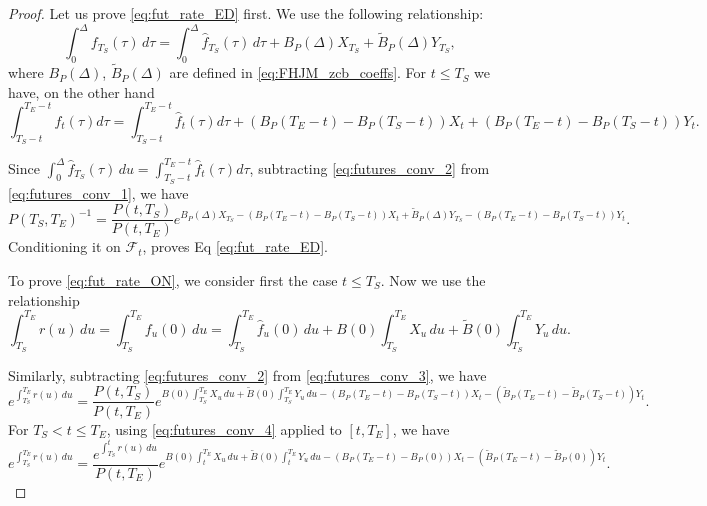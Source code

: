 \documentclass[pdftex,11pt,a4paper] {article}
\begin{document}
\begin{proof}
Let us prove \eqref{eq:fut_rate_ED} first. We use the following relationship:
\begin{equation}\label{eq:futures_conv_1}
\int_0^{\Delta}f_{T_S}(\tau)\,d\tau=\int_0^{\Delta}\hat f_{T_S}(\tau)\,d\tau+B_P(\Delta) X_{T_S}+\tilde B_P(\Delta) Y_{T_S},
\end{equation}
where $B_P(\Delta)$, $\tilde B_P(\Delta)$ are defined in \eqref{eq:FHJM_zcb_coeffs}. 
For $t\le T_S$ we have, on the other hand
\begin{equation}\label{eq:futures_conv_2}
\int_{T_S-t}^{T_E-t}f_{t}(\tau)d\tau=\int_{T_S-t}^{T_E-t}\hat f_{t}(\tau)d\tau+\left(B_P(T_E-t)-B_P(T_S-t)\right) X_{t}+\left(B_P(T_E-t)-B_P(T_S-t)\right) Y_{t}.
\end{equation}

Since $\int_{0}^{\Delta}\hat{f}_{T_S}(\tau)\,du=\int_{T_S-t}^{T_E-t}\hat f_{t}(\tau)d\tau$, 
subtracting \eqref{eq:futures_conv_2} from \eqref{eq:futures_conv_1}, we have 
\begin{equation*}
P(T_S,T_E)^{-1}=\frac{P(t,T_S)}{P(t,T_E)}e^{B_P(\Delta) X_{T_S}-\left(B_P(T_E-t)-B_P(T_S-t)\right) X_{t}+
\tilde B_P(\Delta) Y_{T_S}-\left(B_P(T_E-t)-B_P(T_S-t)\right) Y_{t}}.
\end{equation*}
Conditioning it on $\mathcal{F}_t$, proves Eq \eqref{eq:fut_rate_ED}. 

To prove \eqref{eq:fut_rate_ON}, we consider first the case $t\le T_S$. Now we use the relationship
\begin{equation}\label{eq:futures_conv_3}
\int_{T_S}^{T_E}r(u)\,du=\int_{T_S}^{T_E}f_u(0)\,du=\int_{T_S}^{T_E}\hat{f}_u(0)\,du+B(0)\int_{T_S}^{T_E}X_u\,du+\tilde B(0)\int_{T_S}^{T_E}Y_u\,du.
\end{equation}


Similarly, subtracting \eqref{eq:futures_conv_2} from \eqref{eq:futures_conv_3}, we have
\begin{equation}\label{eq:futures_conv_4}
e^{\int_{T_S}^{T_E}r(u)\,du}=\frac{P(t,T_S)}{P(t,T_E)}e^{B(0)\int_{T_S}^{T_E}X_u\,du+\tilde B(0)\int_{T_S}^{T_E}Y_u\,du-\left(B_P(T_E-t)-B_P(T_S-t)\right) X_{t}-\left(\tilde B_P(T_E-t)-\tilde B_P(T_S-t)\right) Y_{t}}.
\end{equation}
For $T_S<t\le T_E$, using \eqref{eq:futures_conv_4} applied to $[t,T_E]$, we have
\begin{equation}\label{eq:futures_conv_5}
e^{\int_{T_S}^{T_E}r(u)\,du}=\frac{e^{\int_{T_S}^t r(u)\,du}}{P(t,T_E)}e^{B(0)\int_{t}^{T_E}X_u\,du+\tilde B(0)\int_{t}^{T_E}Y_u\,du-\left(B_P(T_E-t)-B_P(0)\right) X_{t}-\left(\tilde B_P(T_E-t)-\tilde B_P(0)\right) Y_{t}}.
\end{equation}



\end{proof}
\end{document}
